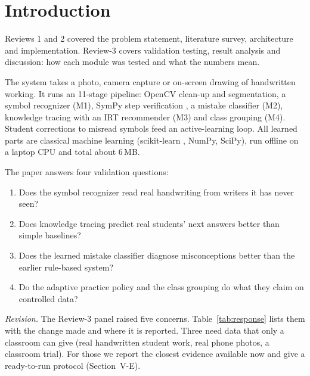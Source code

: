 \documentclass[conference]{IEEEtran}
\begin{document}
\section{Introduction}
Reviews 1 and 2 covered the problem statement, literature survey, architecture and implementation. Review-3 covers validation testing, result analysis and discussion: how each module was tested and what the numbers mean.

The system takes a photo, camera capture or on-screen drawing of handwritten working. It runs an 11-stage pipeline: OpenCV clean-up and segmentation, a symbol recognizer (M1), SymPy step verification \cite{sympy}, a mistake classifier (M2), knowledge tracing with an IRT recommender (M3) and class grouping (M4). Student corrections to misread symbols feed an active-learning loop. All learned parts are classical machine learning (scikit-learn \cite{sklearn}, NumPy, SciPy), run offline on a laptop CPU and total about 6\,MB.

The paper answers four validation questions:
\begin{enumerate}
\item Does the symbol recognizer read real handwriting from writers it has never seen?
\item Does knowledge tracing predict real students' next answers better than simple baselines?
\item Does the learned mistake classifier diagnose misconceptions better than the earlier rule-based system?
\item Do the adaptive practice policy and the class grouping do what they claim on controlled data?
\end{enumerate}

\textit{Revision.} The Review-3 panel raised five concerns. Table~\ref{tab:response} lists them with the change made and where it is reported. Three need data that only a classroom can give (real handwritten student work, real phone photos, a classroom trial). For those we report the closest evidence available now and give a ready-to-run protocol (Section~V-E).
\end{document}
